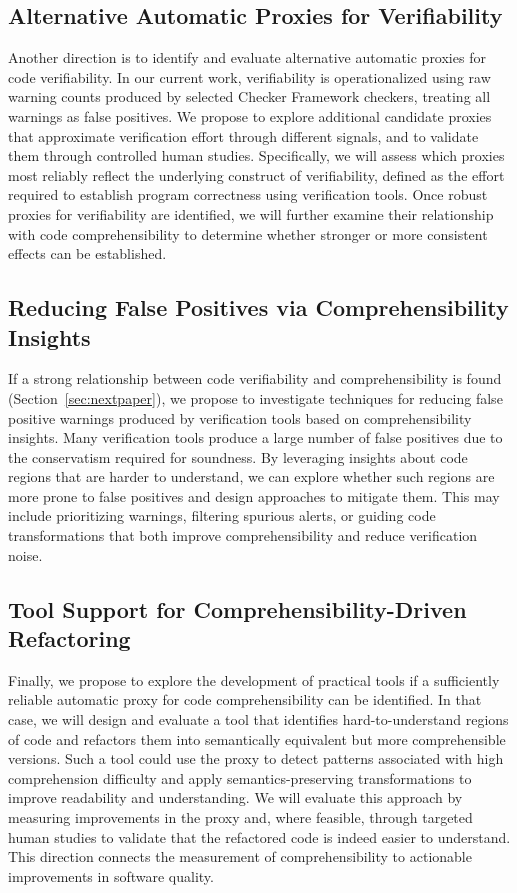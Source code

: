 \subsection{Alternative Automatic Proxies for Verifiability}

Another direction is to identify and evaluate alternative automatic proxies for code verifiability. In our current work, verifiability is operationalized using raw warning counts produced by selected Checker Framework checkers, treating all warnings as false positives. We propose to explore additional candidate proxies that approximate verification effort through different signals, and to validate them through controlled human studies. Specifically, we will assess which proxies most reliably reflect the underlying construct of verifiability, defined as the effort required to establish program correctness using verification tools. Once robust proxies for verifiability are identified, we will further examine their relationship with code comprehensibility to determine whether stronger or more consistent effects can be established.

\subsection{Reducing False Positives via Comprehensibility Insights}

If a strong relationship between code verifiability and comprehensibility is found (Section~\ref{sec:nextpaper}), we propose to investigate techniques for reducing false positive warnings produced by verification tools based on comprehensibility insights. Many verification tools produce a large number of false positives due to the conservatism required for soundness. By leveraging insights about code regions that are harder to understand, we can explore whether such regions are more prone to false positives and design approaches to mitigate them. This may include prioritizing warnings, filtering spurious alerts, or guiding code transformations that both improve comprehensibility and reduce verification noise.

\subsection{Tool Support for Comprehensibility-Driven Refactoring}

Finally, we propose to explore the development of practical tools if a sufficiently reliable automatic proxy for code comprehensibility can be identified. In that case, we will design and evaluate a tool that identifies hard-to-understand regions of code and refactors them into semantically equivalent but more comprehensible versions. Such a tool could use the proxy to detect patterns associated with high comprehension difficulty and apply semantics-preserving transformations to improve readability and understanding. We will evaluate this approach by measuring improvements in the proxy and, where feasible, through targeted human studies to validate that the refactored code is indeed easier to understand. This direction connects the measurement of comprehensibility to actionable improvements in software quality.